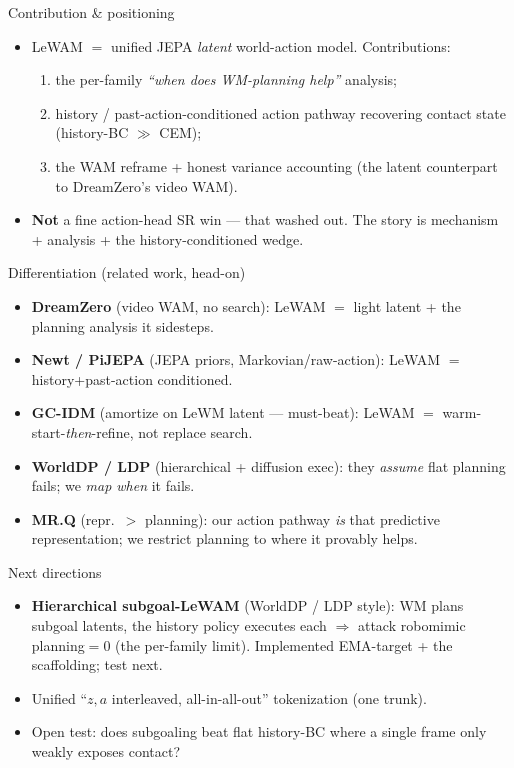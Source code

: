 \documentclass[aspectratio=169,9pt]{beamer}
\begin{document}
\begin{frame}{Contribution \& positioning}
\begin{itemize}
  \item LeWAM $=$ unified JEPA \emph{latent} world-action model. Contributions:
  \begin{enumerate}
    \item the per-family \emph{``when does WM-planning help''} analysis;
    \item history / past-action-conditioned action pathway recovering contact state (history-BC $\gg$ CEM);
    \item the WAM reframe + honest variance accounting (the latent counterpart to DreamZero's video WAM).
  \end{enumerate}
  \item \textbf{Not} a fine action-head SR win --- that washed out. The story is mechanism + analysis + the history-conditioned wedge.
\end{itemize}
\end{frame}

\begin{frame}{Differentiation (related work, head-on)}
\footnotesize
\begin{itemize}
  \item \textbf{DreamZero} (video WAM, no search): LeWAM $=$ light latent + the planning analysis it sidesteps.
  \item \textbf{Newt / PiJEPA} (JEPA priors, Markovian/raw-action): LeWAM $=$ history+past-action conditioned.
  \item \textbf{GC-IDM} (amortize on LeWM latent --- must-beat): LeWAM $=$ warm-start-\emph{then}-refine, not replace search.
  \item \textbf{WorldDP / LDP} (hierarchical + diffusion exec): they \emph{assume} flat planning fails; we \emph{map when} it fails.
  \item \textbf{MR.Q} (repr.\ $>$ planning): our action pathway \emph{is} that predictive representation; we restrict planning to where it provably helps.
\end{itemize}
\end{frame}

\begin{frame}{Next directions}
\begin{itemize}
  \item \textbf{Hierarchical subgoal-LeWAM} (WorldDP / LDP style): WM plans subgoal latents, the history policy executes each $\Rightarrow$ attack robomimic planning$=0$ (the per-family limit). Implemented EMA-target + the scaffolding; test next.
  \item Unified ``$z, a$ interleaved, all-in-all-out'' tokenization (one trunk).
  \item Open test: does subgoaling beat flat history-BC where a single frame only weakly exposes contact?
\end{itemize}
\end{frame}
\end{document}
